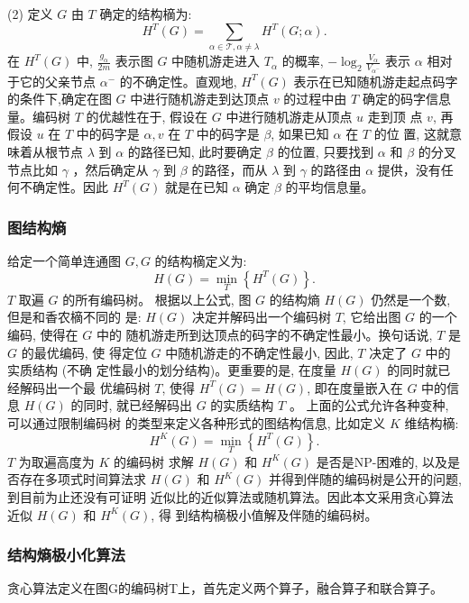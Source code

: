 \documentclass[a4paper]{apa6}
\begin{document}
(2) 定义 \(G\) 由 \(T\) 确定的结构樀为:
$$
H^{T}(G)=\sum_{\alpha \in \mathcal{T}, \alpha \neq \lambda} H^{T}(G ; \alpha) .
$$
在 \(H^{T}(G)\) 中, \(\frac{g_{\alpha}}{2 m}\) 表示图 \(G\) 中随机游走进入 \(T_{\alpha}\) 的概率, \(-\log_{2} \frac{V_{\alpha}}{V_{\alpha^{-}}}\) 表示 \(\alpha\) 相对于它的父亲节点 \(\alpha^{-}\) 的不确定性。直观地, \(H^{T}(G)\) 表示在已知随机游走起点码字的条件下,确定在图 \(G\) 中进行随机游走到达顶点 \(v\) 的过程中由 \(T\) 确定的码字信息量。编码树 \(T\) 的优越性在于, 假设在 \(G\) 中进行随机游走从顶点 \(u\) 走到顶 点 \(v\), 再假设 \(u\) 在 \(T\) 中的码字是 \(\alpha, v\) 在 \(T\) 中的码字是 \(\beta\), 如果已知 \(\alpha\) 在 \(T\) 的位 置, 这就意味着从根节点 \(\lambda\) 到 \(\alpha\) 的路径已知, 此时要确定 \(\beta\) 的位置, 只要找到 \(\alpha\) 和 \(\beta\) 的分叉节点比如 \(\gamma\) ，然后确定从 \(\gamma\) 到 \(\beta\) 的路径，而从 \(\lambda\) 到 \(\gamma\) 的路径由 \(\alpha\) 提供，没有任何不确定性。因此 \(H^{T}(G)\) 就是在已知 \(\alpha\) 确定 \(\beta\) 的平均信息量。

\subsubsection{图结构熵}
\label{sec:org630a8f0}
给定一个简单连通图 \(G, G\) 的结构樀定义为:
$$
H(G)=\min _{T}\left\{H^{T}(G)\right\} .
$$
\(T\) 取遍 \(G\) 的所有编码树。
根据以上公式, 图 \(G\) 的结构熵 \(H(G)\) 仍然是一个数, 但是和香农樀不同的 是: \(H(G)\) 决定并解码出一个编码树 \(T\), 它给出图 \(G\) 的一个编码, 使得在 \(G\) 中的 随机游走所到达顶点的码字的不确定性最小。换句话说, \(T\) 是 \(G\) 的最优编码, 使 得定位 \(G\) 中随机游走的不确定性最小, 因此, \(T\) 决定了 \(G\) 中的实质结构 (不确 定性最小的划分结构)。更重要的是, 在度量 \(H(G)\) 的同时就已经解码出一个最 优编码树 \(T\), 使得 \(H^{T}(G)=H(G)\), 即在度量嵌入在 \(G\) 中的信息 \(H(G)\) 的同时, 就已经解码出 \(G\) 的实质结构 \(T\) 。 上面的公式允许各种变种, 可以通过限制编码树 的类型来定义各种形式的图结构信息, 比如定义 \(K\) 维结构樀:
$$
H^{K}(G)=\min _{T}\left\{H^{T}(G)\right\} .
$$
\(T\) 为取遍高度为 \(K\) 的编码树
求解 \(H(G)\) 和 \(H^{K}(G)\) 是否是NP-困难的, 以及是否存在多项式时间算法求 \(H(G)\) 和 \(H^{K}(G)\) 并得到伴随的编码树是公开的问题, 到目前为止还没有可证明 近似比的近似算法或随机算法。因此本文采用贪心算法近似 \(H(G)\) 和 \(H^{K}(G)\), 得 到结构樀极小值解及伴随的编码树。

\subsubsection{结构熵极小化算法}
\label{sec:org32fbeeb}
贪心算法定义在图G的编码树T上，首先定义两个算子，融合算子和联合算子。
\end{document}
